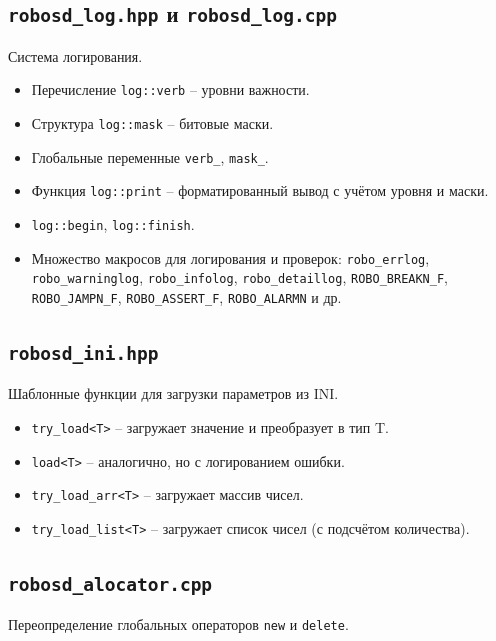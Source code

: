 \documentclass[a4paper,12pt]{article}
\begin{document}
\subsection{\texttt{robosd\_log.hpp} и \texttt{robosd\_log.cpp}}

Система логирования.

\begin{itemize}
    \item Перечисление \texttt{log::verb} -- уровни важности.
    \item Структура \texttt{log::mask} -- битовые маски.
    \item Глобальные переменные \texttt{verb\_}, \texttt{mask\_}.
    \item Функция \texttt{log::print} -- форматированный вывод с учётом уровня и маски.
    \item \texttt{log::begin}, \texttt{log::finish}.
    \item Множество макросов для логирования и проверок: \texttt{robo\_errlog}, \texttt{robo\_warninglog}, \texttt{robo\_infolog}, \texttt{robo\_detaillog}, \texttt{ROBO\_BREAKN\_F}, \texttt{ROBO\_JAMPN\_F}, \texttt{ROBO\_ASSERT\_F}, \texttt{ROBO\_ALARMN} и др.
\end{itemize}

\subsection{\texttt{robosd\_ini.hpp}}

Шаблонные функции для загрузки параметров из INI.

\begin{itemize}
    \item \texttt{try\_load<T>} -- загружает значение и преобразует в тип T.
    \item \texttt{load<T>} -- аналогично, но с логированием ошибки.
    \item \texttt{try\_load\_arr<T>} -- загружает массив чисел.
    \item \texttt{try\_load\_list<T>} -- загружает список чисел (с подсчётом количества).
\end{itemize}

\subsection{\texttt{robosd\_alocator.cpp}}

Переопределение глобальных операторов \texttt{new} и \texttt{delete}.
\end{document}
